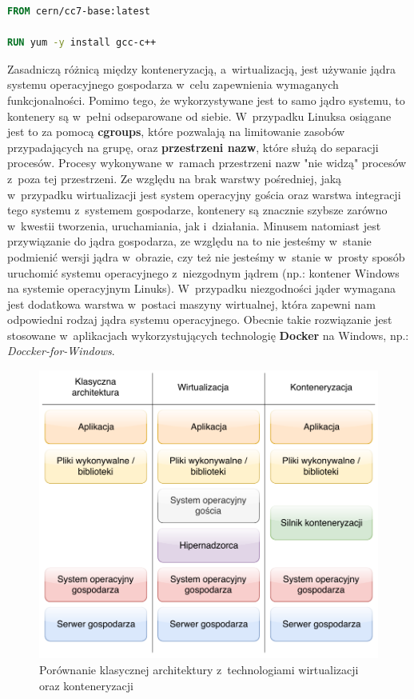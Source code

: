 \begin{lstlisting}[label={lis:dockerfile}, language=Dockerfile, caption={Przykładowy Dockerfile}]
FROM cern/cc7-base:latest

RUN yum -y install gcc-c++
\end{lstlisting}

Zasadniczą różnicą między konteneryzacją, a~wirtualizacją, jest używanie jądra systemu operacyjnego gospodarza w~celu zapewnienia wymaganych funkcjonalności. Pomimo tego, że wykorzystywane jest to samo jądro systemu, to kontenery są w~pełni odseparowane od siebie. W~przypadku Linuksa osiągane jest to za pomocą \textbf{cgroups}, które pozwalają na limitowanie zasobów przypadających na grupę, oraz \textbf{przestrzeni nazw}, które służą do separacji procesów. Procesy wykonywane w~ramach przestrzeni nazw "nie widzą" procesów z~poza tej przestrzeni. Ze względu na brak warstwy pośredniej, jaką w~przypadku wirtualizacji jest system operacyjny gościa oraz warstwa integracji tego systemu z~systemem gospodarze, kontenery są znacznie szybsze zarówno w~kwestii tworzenia, uruchamiania, jak i~działania. Minusem natomiast jest przywiązanie do jądra gospodarza, ze względu na to nie jesteśmy w~stanie podmienić wersji jądra w~obrazie, czy też nie jesteśmy w~stanie w~prosty sposób uruchomić systemu operacyjnego z~niezgodnym jądrem (np.: kontener Windows na systemie operacyjnym Linuks). W~przypadku niezgodności jąder wymagana jest dodatkowa warstwa w~postaci maszyny wirtualnej, która zapewni nam odpowiedni rodzaj jądra systemu operacyjnego. Obecnie takie rozwiązanie jest stosowane w~aplikacjach wykorzystujących technologię \textbf{Docker} na Windows, np.: \textit{Doccker-for-Windows}. \cite{Kont2} \cite{Kont3}

\begin{figure} [H]
\centering
\caption{Porównanie klasycznej architektury z~technologiami wirtualizacji oraz konteneryzacji \cite{Kont4}}
\includegraphics[width=\textwidth]{res/virtualizationAndContenerizatrionComparison}
\end{figure}